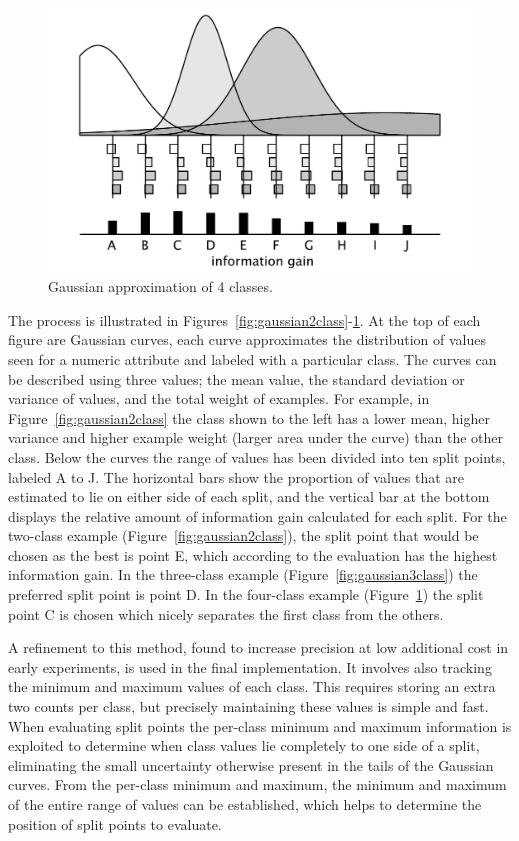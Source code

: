 \begin{figure}
\includegraphics[width=\linewidth]{figures/gaussian4class}
\caption{Gaussian approximation of 4 classes.}
\label{fig:gaussian4class}
\end{figure}

The process is illustrated in Figures~\ref{fig:gaussian2class}-\ref{fig:gaussian4class}. At the top of each figure are Gaussian curves, each curve approximates the distribution of values seen for a numeric attribute and labeled with a particular class. The curves can be described using three values; the mean value, the standard deviation or variance of values, and the total weight of examples. For example, in Figure~\ref{fig:gaussian2class} the class shown to the left has a lower mean, higher variance and higher example weight (larger area under the curve) than the other class. Below the curves the range of values has been divided into ten split points, labeled A to J. The horizontal bars show the proportion of values that are estimated to lie on either side of each split, and the vertical bar at the bottom displays the relative amount of information gain calculated for each split. For the two-class example (Figure~\ref{fig:gaussian2class}), the split point that would be chosen as the best is point E, which according to the evaluation has the highest information gain. In the three-class example (Figure~\ref{fig:gaussian3class}) the preferred split point is point D. In the four-class example (Figure~\ref{fig:gaussian4class}) the split point C is chosen which nicely separates the first class from the others.

A refinement to this method, found to increase precision at low additional cost in early experiments, is used in the final implementation. It involves also tracking the minimum and maximum values of each class. This requires storing an extra two counts per class, but precisely maintaining these values is simple and fast. When evaluating split points the per-class minimum and maximum information is exploited to determine when class values lie completely to one side of a split, eliminating the small uncertainty otherwise present in the tails of the Gaussian curves. From the per-class minimum and maximum, the minimum and maximum of the entire range of values can be established, which helps to determine the position of split points to evaluate.

